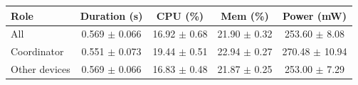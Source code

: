 \begin{tabular}{lcccc}
\hline
\textbf{Role} & \textbf{Duration (s)} & \textbf{CPU (\%)} & \textbf{Mem (\%)} & \textbf{Power (mW)} \\
\hline
All & 0.569 $\pm$ 0.066 & 16.92 $\pm$ 0.68 & 21.90 $\pm$ 0.32 & 253.60 $\pm$ 8.08 \\
Coordinator & 0.551 $\pm$ 0.073 & 19.44 $\pm$ 0.51 & 22.94 $\pm$ 0.27 & 270.48 $\pm$ 10.94 \\
Other devices & 0.569 $\pm$ 0.066 & 16.83 $\pm$ 0.48 & 21.87 $\pm$ 0.25 & 253.00 $\pm$ 7.29 \\
\hline
\end{tabular}
